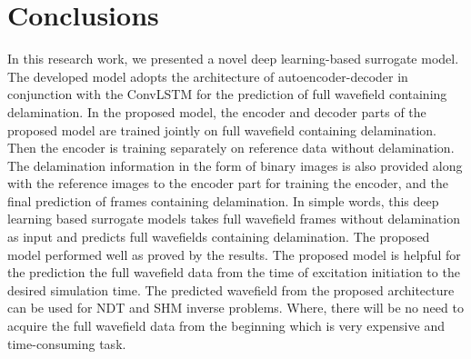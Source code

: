 \section{Conclusions}
\label{conclusion}
In this research work, we presented a novel deep learning-based surrogate 
model. 
The developed model adopts the architecture of autoencoder-decoder in 
conjunction with the ConvLSTM for the prediction of full wavefield containing 
delamination. 
In the proposed model, the encoder and decoder parts of the proposed model 
are trained jointly on full wavefield containing delamination. 
Then the encoder is training separately on reference data without delamination. 
The delamination information in the form of binary images is also provided 
along with the reference images to the encoder part for training the encoder, 
and the final prediction of frames containing delamination.
In simple words, this deep learning based surrogate models takes full wavefield 
frames without delamination as input and predicts full wavefields containing 
delamination.
The proposed model performed well as proved by the results.
The proposed model is helpful for the prediction the full wavefield data from 
the time of excitation initiation to the desired simulation time. 
The predicted wavefield from the proposed architecture can be used for NDT and 
SHM inverse problems.
Where, there will be no need to acquire the full wavefield data from the 
beginning which is very expensive and time-consuming task.